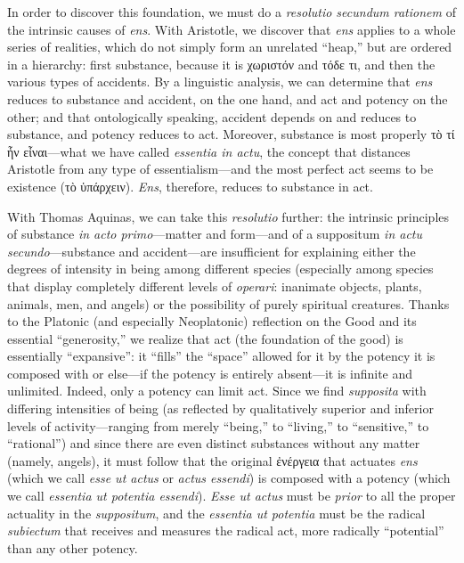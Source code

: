 In order to discover this foundation, we must do a \emph{resolutio secundum rationem} of the intrinsic causes of \emph{ens}. With Aristotle, we discover that \emph{ens} applies to a whole series of realities, which do not simply form an unrelated “heap,” but are ordered in a hierarchy: first substance, because it is χωριστόν and τόδε τι, and then the various types of accidents. By a linguistic analysis, we can determine that \emph{ens} reduces to substance and accident, on the one hand, and act and potency on the other; and that ontologically speaking, accident depends on and reduces to substance, and potency reduces to act. Moreover, substance is most properly τὸ τί ἦν εἶναι—what we have called \emph{essentia in actu}, the concept that distances Aristotle from any type of essentialism—and the most perfect act seems to be existence (τὸ ὑπάρχειν). \emph{Ens}, therefore, reduces to substance in act.

With Thomas Aquinas, we can take this \emph{resolutio} further: the intrinsic principles of substance \emph{in acto primo}—matter and form—and of a suppositum \emph{in actu secundo}—substance and accident—are insufficient for explaining either the degrees of intensity in being among different species (especially among species that display completely different levels of \emph{operari}: inanimate objects, plants, animals, men, and angels) or the possibility of purely spiritual creatures.
Thanks to the Platonic (and especially Neoplatonic) reflection on the Good and its essential “generosity,” we realize that act (the foundation of the good) is essentially “expansive”: it “fills” the “space” allowed for it by the potency it is composed with or else—if the potency is entirely absent—it is infinite and unlimited. Indeed, only a potency can limit act. Since we find \emph{supposita} with differing intensities of being (as reflected by qualitatively superior and inferior levels of activity—ranging from merely “being,” to “living,” to “sensitive,” to “rational”) and since the\emph{}re are even distinct substances without any matter (namely, angels), it must follow that the original ἐνέργεια that actuates \emph{ens} (which we call \emph{esse ut actus} or \emph{actus essendi}) is composed with a potency (which we call \emph{essentia ut potentia essendi}). \emph{Esse ut actus} must be \emph{prior} to all the proper actuality in the \emph{suppositum}, and the \emph{essentia ut potentia} must be the radical \emph{subiectum} that receives and measures the radical act, more radically “potential” than any other potency.

